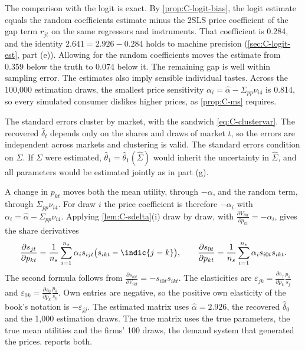 The comparison with the logit is exact. By \cref{prop:C-logit-bias}, the logit estimate equals the random coefficients
estimate minus the 2SLS price coefficient of the gap term $r_{jt}$ on the same regressors and instruments. That
coefficient is 0.284, and the identity $2.641 = 2.926 - 0.284$ holds to machine precision (\cref{sec:C-logit-est},
part (e)). Allowing for the random coefficients
moves the estimate from 0.359 below the truth to 0.074 below it. The remaining gap is well within sampling error. The
estimates also imply sensible individual tastes. Across the 100,000 estimation draws, the smallest price sensitivity
$\alpha_i = \hat\alpha - \Sigma_{pp}\nu_{i4}$ is 0.814, so every simulated consumer dislikes higher prices, as
\cref{prop:C-ms} requires.

The standard errors cluster by market, with the sandwich \eqref{eq:C-clustervar}. The recovered $\hat\delta_t$ depends
only on the shares and draws of market $t$, so the errors are independent across markets and clustering is valid. The
standard errors condition on $\Sigma$. If $\Sigma$ were estimated, $\hat\theta_1 = \hat\theta_1(\hat\Sigma)$ would inherit
the uncertainty in $\hat\Sigma$, and all parameters would be estimated jointly as in part (g).

A change in $p_{kt}$ moves both the mean utility, through $-\alpha$, and the random term, through $\Sigma_{pp}\nu_{i4}$.
For draw $i$ the price coefficient is therefore $-\alpha_i$ with $\alpha_i = \hat\alpha - \Sigma_{pp}\nu_{i4}$. Applying
\cref{lem:C-sdelta}(i) draw by draw, with $\frac{\partial V_{ikt}}{\partial p_{kt}} = -\alpha_i$, gives the share
derivatives
\begin{equation}\label{eq:C-rc-elast}
  \frac{\partial s_{jt}}{\partial p_{kt}} = \frac{1}{n_s}\sum_{i=1}^{n_s}\alpha_is_{ijt}\big(s_{ikt} - \indic\{j = k\}\big) ,
  \qquad
  \frac{\partial s_{0t}}{\partial p_{kt}} = \frac{1}{n_s}\sum_{i=1}^{n_s}\alpha_is_{i0t}s_{ikt} .
\end{equation}
The second formula follows from $\frac{\partial s_{i0t}}{\partial V_{ikt}} = -s_{i0t}s_{ikt}$. The elasticities are
$\varepsilon_{jk} = \frac{\partial s_j}{\partial p_k}\frac{p_k}{s_j}$ and
$\varepsilon_{0k} = \frac{\partial s_0}{\partial p_k}\frac{p_k}{s_0}$. Own entries are negative, so the positive own
elasticity of the book's notation is $-\varepsilon_{jj}$. The estimated matrix uses $\hat\alpha = 2.926$, the recovered
$\hat\delta_0$ and the 1,000 estimation draws. The true matrix uses the true parameters, the true mean utilities and
the firms' 100 draws, the demand system that generated the prices.  reports both.

